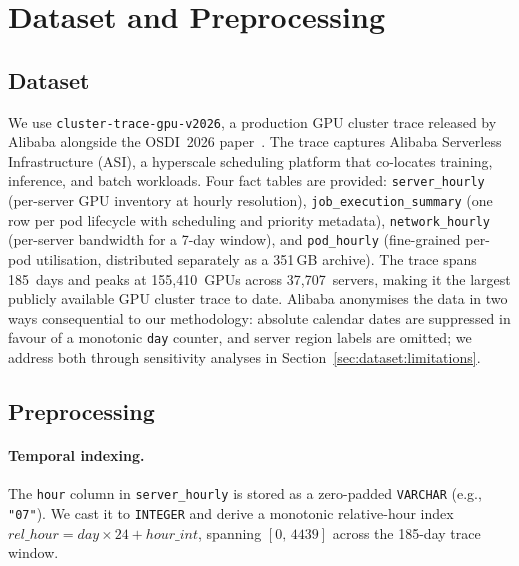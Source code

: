 \section{Dataset and Preprocessing}
\label{sec:dataset}

\subsection{Dataset}
\label{sec:dataset:source}

We use \texttt{cluster-trace-gpu-v2026}, a production GPU cluster trace
released by Alibaba alongside the OSDI~2026 paper~\cite{alibaba2026trace}.
The trace captures Alibaba Serverless Infrastructure (ASI), a hyperscale
scheduling platform that co-locates training, inference, and batch workloads.
Four fact tables are provided: \texttt{server\_hourly} (per-server GPU
inventory at hourly resolution), \texttt{job\_execution\_summary} (one row
per pod lifecycle with scheduling and priority metadata),
\texttt{network\_hourly} (per-server bandwidth for a 7-day window), and
\texttt{pod\_hourly} (fine-grained per-pod utilisation, distributed
separately as a 351\,GB archive).
The trace spans 185~days and peaks at 155{,}410~GPUs across 37{,}707~servers,
making it the largest publicly available GPU cluster trace to date.
Alibaba anonymises the data in two ways consequential to our methodology:
absolute calendar dates are suppressed in favour of a monotonic \texttt{day}
counter, and server region labels are omitted; we address both through
sensitivity analyses in Section~\ref{sec:dataset:limitations}.

\subsection{Preprocessing}
\label{sec:dataset:preprocessing}

\paragraph{Temporal indexing.}
The \texttt{hour} column in \texttt{server\_hourly} is stored as a
zero-padded \texttt{VARCHAR} (e.g., \texttt{"07"}).
We cast it to \texttt{INTEGER} and derive a monotonic relative-hour index
$\mathit{rel\_hour} = \mathit{day} \times 24 + \mathit{hour\_int}$,
spanning $[0,\,4439]$ across the 185-day trace window.

